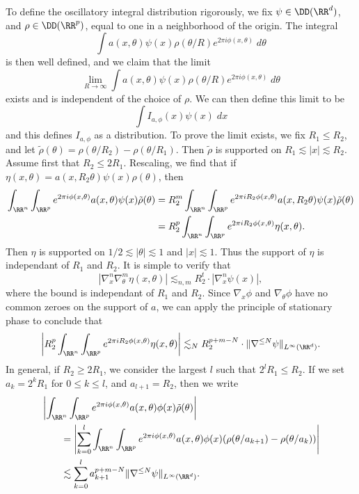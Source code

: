 To define the oscillatory integral distribution rigorously, we fix $\psi \in \DD(\RR^d)$, and $\rho \in \DD(\RR^p)$, equal to one in a neighborhood of the origin. The integral
%
\[ \int a(x,\theta) \psi(x) \rho(\theta / R) e^{2 \pi i \phi(x,\theta)}\; d\theta \]
%
is then well defined, and we claim that the limit
%
\[ \lim_{R \to \infty} \int a(x,\theta) \psi(x) \rho(\theta / R) e^{2 \pi i \phi(x,\theta)}\; d\theta \]
%
exists and is independent of the choice of $\rho$. We can then define this limit to be
%
\[ \int I_{a,\phi}(x) \psi(x)\; dx \]
%
and this defines $I_{a,\phi}$ as a distribution. To prove the limit exists, we fix $R_1 \leq R_2$, and let $\tilde{\rho}(\theta) = \rho(\theta/R_2) - \rho(\theta/R_1)$. Then $\tilde{\rho}$ is supported on $R_1 \lesssim |x| \lesssim R_2$. Assume first that $R_2 \leq 2R_1$. Rescaling, we find that if $\eta(x,\theta) = a(x,R_2 \theta) \psi(x) \rho(\theta)$, then
%
\begin{align*}
    \int_{\RR^n} \int_{\RR^p} e^{2 \pi i \phi(x,\theta)} a(x,\theta) \psi(x) \tilde{\rho}(\theta) &= R_2^m \int_{\RR^n} \int_{\RR^p} e^{2 \pi i R_2 \phi(x,\theta)} a(x,R_2 \theta) \psi(x) \tilde{\rho}(\theta)\\
    &= R_2^p \int_{\RR^n} \int_{\RR^p} e^{2 \pi i R_2 \phi(x,\theta)} \eta(x,\theta).
\end{align*}
%
Then $\eta$ is supported on $1/2 \lesssim |\theta| \lesssim 1$ and $|x| \lesssim 1$. Thus the support of $\eta$ is independant of $R_1$ and $R_2$. It is simple to verify that
%
\[ |\nabla^n_x \nabla^m_\theta \eta(x,\theta)| \lesssim_{n,m} R_2^t \cdot |\nabla^n_x \psi(x)|, \]
%
where the bound is independant of $R_1$ and $R_2$. Since $\nabla_x \phi$ and $\nabla_\theta \phi$ have no common zeroes on the support of $a$, we can apply the principle of stationary phase to conclude that
%
\[ \left| R_2^p \int_{\RR^n} \int_{\RR^p} e^{2 \pi i R_2 \phi(x,\theta)} \eta(x,\theta) \right| \lesssim_N R_2^{p + m - N} \cdot \| \nabla^{\leq N} \psi \|_{L^\infty(\RR^d)}. \]
%
In general, if $R_2 \geq 2R_1$, we consider the largest $l$ such that $2^l R_1 \leq R_2$. If we set $a_k = 2^k R_1$ for $0 \leq k \leq l$, and $a_{l+1} = R_2$, then we write
%
\begin{align*}
    &\left| \int_{\RR^n} \int_{\RR^p} e^{2 \pi i \phi(x,\theta)} a(x,\theta) \phi(x) \tilde{\rho}(\theta) \right|\\
    &\quad\quad= \left| \sum_{k = 0}^l \int_{\RR^n} \int_{\RR^p} e^{2 \pi i \phi(x,\theta)} a(x,\theta) \phi(x) (\rho(\theta/a_{k+1}) - \rho(\theta / a_k)) \right|\\
    &\quad\quad\lesssim \sum_{k = 0}^l a_{k+1}^{p + m - N} \| \nabla^{\leq N} \psi \|_{L^\infty(\RR^d)}. 
\end{align*}
